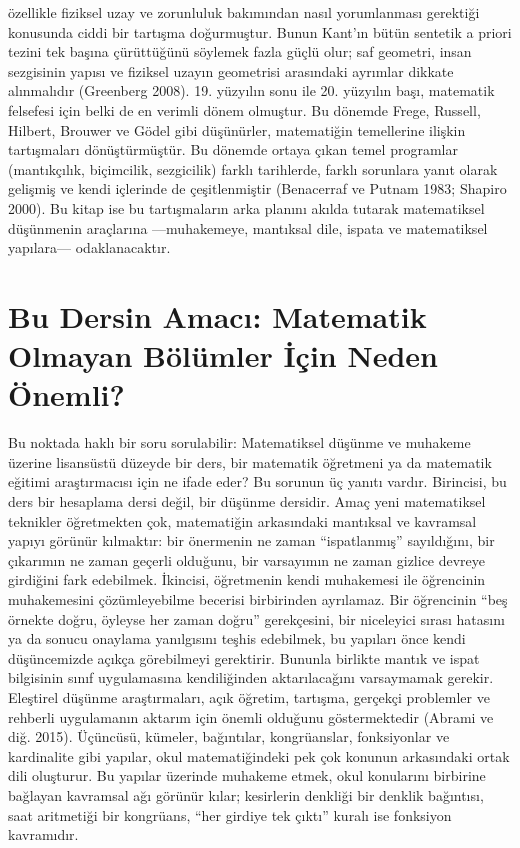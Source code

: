 özellikle fiziksel uzay ve zorunluluk bakımından nasıl yorumlanması gerektiği konusunda ciddi bir tartışma doğurmuştur. Bunun Kant’ın bütün sentetik a priori tezini tek başına çürüttüğünü söylemek fazla güçlü olur; saf geometri, insan sezgisinin yapısı ve fiziksel uzayın geometrisi arasındaki ayrımlar dikkate alınmalıdır (Greenberg 2008). 19. yüzyılın sonu ile 20. yüzyılın başı, matematik felsefesi için belki de en verimli dönem olmuştur. Bu dönemde Frege, Russell, Hilbert, Brouwer ve Gödel gibi düşünürler, matematiğin temellerine ilişkin tartışmaları dönüştürmüştür. Bu dönemde ortaya çıkan temel programlar (mantıkçılık, biçimcilik, sezgicilik) farklı tarihlerde, farklı sorunlara yanıt olarak gelişmiş ve kendi içlerinde de çeşitlenmiştir (Benacerraf ve Putnam 1983; Shapiro 2000). Bu kitap ise bu tartışmaların arka planını akılda tutarak matematiksel düşünmenin araçlarına —muhakemeye, mantıksal dile, ispata ve matematiksel yapılara— odaklanacaktır.

\section{Bu Dersin Amacı: Matematik Olmayan Bölümler İçin Neden Önemli?}

Bu noktada haklı bir soru sorulabilir: Matematiksel düşünme ve muhakeme üzerine lisansüstü düzeyde bir ders, bir matematik öğretmeni ya da matematik eğitimi araştırmacısı için ne ifade eder? Bu sorunun üç yanıtı vardır. Birincisi, bu ders bir hesaplama dersi değil, bir düşünme dersidir. Amaç yeni matematiksel teknikler öğretmekten çok, matematiğin arkasındaki mantıksal ve kavramsal yapıyı görünür kılmaktır: bir önermenin ne zaman “ispatlanmış” sayıldığını, bir çıkarımın ne zaman geçerli olduğunu, bir varsayımın ne zaman gizlice devreye girdiğini fark edebilmek. İkincisi, öğretmenin kendi muhakemesi ile öğrencinin muhakemesini çözümleyebilme becerisi birbirinden ayrılamaz. Bir öğrencinin “beş örnekte doğru, öyleyse her zaman doğru” gerekçesini, bir niceleyici sırası hatasını ya da sonucu onaylama yanılgısını teşhis edebilmek, bu yapıları önce kendi düşüncemizde açıkça görebilmeyi gerektirir. Bununla birlikte mantık ve ispat bilgisinin sınıf uygulamasına kendiliğinden aktarılacağını varsaymamak gerekir. Eleştirel düşünme araştırmaları, açık öğretim, tartışma, gerçekçi problemler ve rehberli uygulamanın aktarım için önemli olduğunu göstermektedir (Abrami ve diğ. 2015). Üçüncüsü, kümeler, bağıntılar, kongrüanslar, fonksiyonlar ve kardinalite gibi yapılar, okul matematiğindeki pek çok konunun arkasındaki ortak dili oluşturur. Bu yapılar üzerinde muhakeme etmek, okul konularını birbirine bağlayan kavramsal ağı görünür kılar; kesirlerin denkliği bir denklik bağıntısı, saat aritmetiği bir kongrüans, “her girdiye tek çıktı” kuralı ise fonksiyon kavramıdır.

